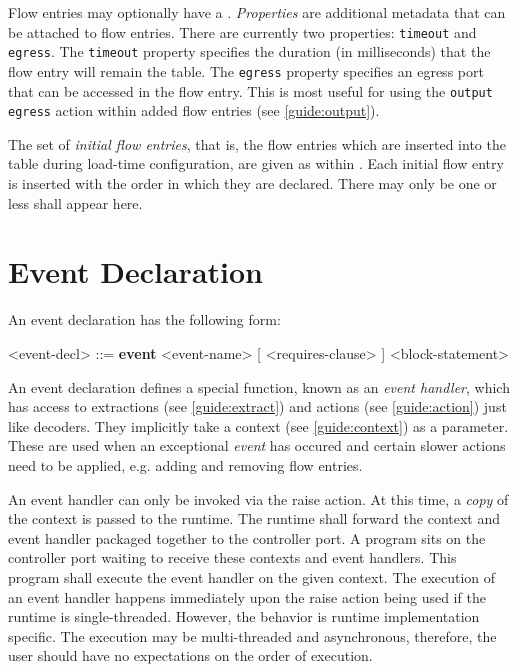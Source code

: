 Flow entries may optionally have a . \textit{Properties} are additional metadata that can be attached to flow entries. There are currently two properties: \texttt{timeout} and \texttt{egress}. The \texttt{timeout} property specifies the duration (in milliseconds) that the flow entry will remain the table. The \texttt{egress} property specifies an egress port that can be accessed in the flow entry. This is most useful for using the \texttt{output egress} action within added flow entries (see \ref{guide:output}).

The set of \textit{initial flow entries}, that is, the flow entries which are inserted into the table during load-time configuration, are given as  within . Each initial flow entry is inserted with the order in which they are declared. There may only be one or less  shall appear here.

\section{Event Declaration} \label{guide:event}

An event declaration has the following form:

\begin{minip}
\begin{grammar}
<event-decl> ::=
\textbf{event} <event-name> [ <requires-clause> ]
<block-statement>
\end{grammar}
\end{minip}

An event declaration defines a special function, known as an \textit{event handler}, which has access to extractions (see \ref{guide:extract}) and actions (see \ref{guide:action}) just like decoders. They implicitly take a context (see \ref{guide:context}) as a parameter. These are used when an exceptional \textit{event} has occured and certain slower actions need to be applied, e.g. adding and removing flow entries.

An event handler can only be invoked via the raise action. At this time, a \textit{copy} of the context is passed to the runtime. The runtime shall forward the context and event handler packaged together to the controller port. A program sits on the controller port waiting to receive these contexts and event handlers. This program shall execute the event handler on the given context. The execution of an event handler happens immediately upon the raise action being used if the runtime is single-threaded. However, the behavior is runtime implementation specific. The execution may be multi-threaded and asynchronous, therefore, the user should have no expectations on the order of execution. 

